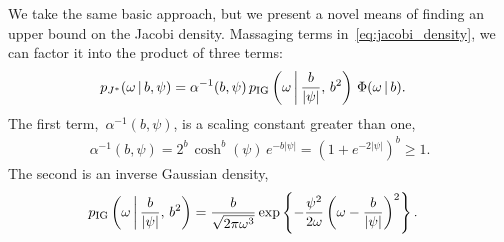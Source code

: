 We take the same basic approach, but we present a novel means of
finding an upper bound on the Jacobi density.  Massaging terms
in~\eqref{eq:jacobi_density}, we can factor it into the product of
three terms:
\begin{align}
  \label{eq:pg_factorization}
  p_{J^{*}}({\omega} \,|\, b,\psi) &= 
   \alpha^{-1}(b,\psi) \,
   p_{\mathrm{IG}}\left({\omega} \, \bigg| \, \frac{b}{|\psi|}, \, b^2 \right) \,
   \Phi({\omega} \,|\, b).
\end{align}
The first term,~$\alpha^{-1}(b,\psi)$, is a scaling constant greater than one,
\begin{align*}
  \alpha^{-1}(b,\psi) = 2^b \, \cosh^b(\psi) \, e^{-b|\psi|} 
  = \left(1 + e^{-2|\psi|} \right)^b \geq 1.
\end{align*}
The second is an inverse Gaussian density,
\begin{align*}
p_{\mathrm{IG}} \left({\omega} \, \bigg| \, \frac{b}{|\psi|}, \, b^2 \right) 
  &= \frac{b}{\sqrt{2\pi {\omega}^3}}
    \exp \left \{ - \frac{\psi^2}{2{\omega}}  \left({\omega} - \frac{b}{|\psi|} \right)^2   \right \}.
\end{align*}
